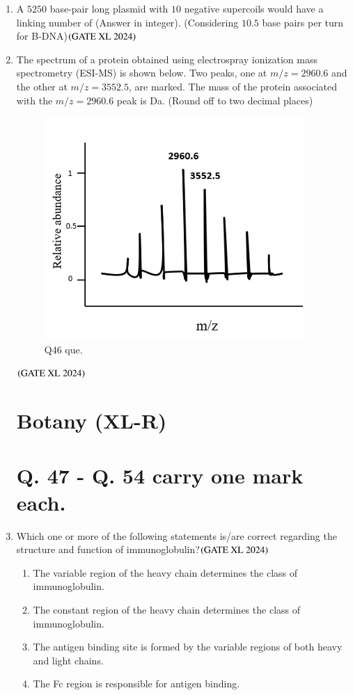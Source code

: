 \documentclass[journal]{IEEEtran}
\begin{document}
\begin{enumerate}
    \item A $5250$ base-pair long plasmid with $10$ negative supercoils would have a linking number of (Answer in integer).  
    (Considering $10.5$ base pairs per turn for B-DNA)\hfill $\left(\text{GATE XL 2024}\right)$

    \item The spectrum of a protein obtained using electrospray ionization mass spectrometry (ESI-MS) is shown below. Two peaks, one at $m/z = 2960.6$ and the other at $m/z = 3552.5$, are marked. The mass of the protein associated with the $m/z = 2960.6$ peak is Da. (Round off to two decimal places)

    \begin{figure}[H]
        \centering
        \includegraphics[width=0.5\columnwidth]{figs/xl2024_q46_que.png}
        \caption{Q46 que.}
    \end{figure}
    \hfill $\left(\text{GATE XL 2024}\right)$

\maketitle
\section*{Botany (XL-R)}
\section*{Q. 47 - Q. 54 carry one mark each.} 
\setcounter{enumi}{46}
    \item Which one or more of the following statements is/are correct regarding the structure and function of immunoglobulin?\hfill $\left(\text{GATE XL 2024}\right)$
    \begin{enumerate}
        \item The variable region of the heavy chain determines the class of immunoglobulin.
        \item The constant region of the heavy chain determines the class of immunoglobulin.
        \item The antigen binding site is formed by the variable regions of both heavy and light chains.
        \item The Fc region is responsible for antigen binding.
    \end{enumerate}


\end{enumerate}
\end{document}
